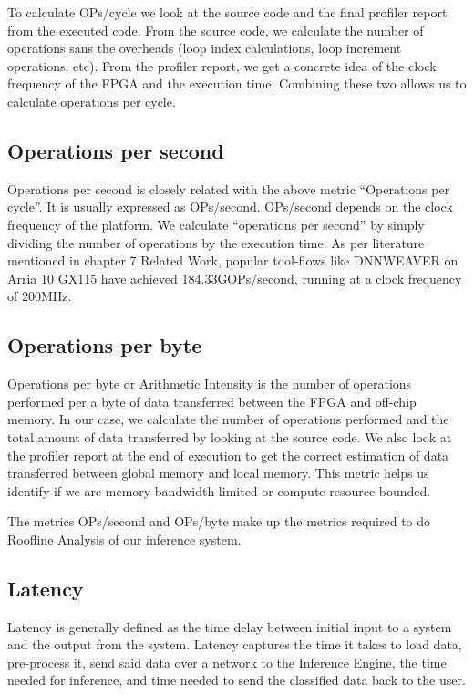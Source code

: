 \documentclass[titlepage]{report}
\begin{document}
To calculate OPs/cycle we look at the source code and the final profiler report from the executed code. From the source code, we calculate the number of operations sans the overheads (loop index calculations, loop increment operations, etc). From the profiler report, we get a concrete idea of the clock frequency of the FPGA and the execution time. Combining these two allows us to calculate operations per cycle.

\subsection{Operations per second}
Operations per second is closely related with the above metric “Operations per cycle”. It is usually expressed as OPs/second. OPs/second depends on the clock frequency of the platform. 
We calculate “operations per second” by simply dividing the number of operations by the execution time.  
As per literature mentioned in chapter 7 Related Work, popular tool-flows like DNNWEAVER on Arria 10 GX115 have achieved 184.33GOPs/second, running at a clock frequency of 200MHz.

\subsection{Operations per byte}
Operations per byte or Arithmetic Intensity is the number of operations performed per a byte of data transferred between the FPGA and off-chip memory.  
In our case, we calculate the number of operations performed and the total amount of data transferred by looking at the source code. We also look at the profiler report at the end of execution to get the correct estimation of data transferred between global memory and local memory.  
This metric helps us identify if we are memory bandwidth limited or compute resource-bounded.  

The metrics OPs/second and OPs/byte make up the metrics required to do Roofline Analysis of our inference system.  


\subsection{Latency}
Latency is generally defined as the time delay between initial input to a system and the output from the system. Latency captures the time it takes to load data, pre-process it, send said data over a network to the Inference Engine, the time needed for inference, and time needed to send the classified data back to the user. 
\end{document}
